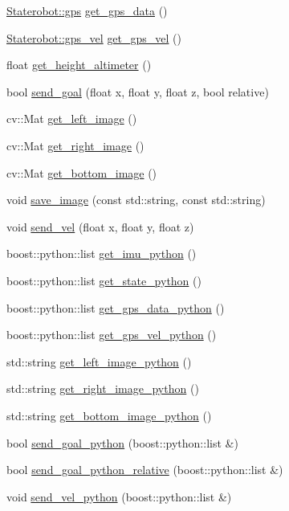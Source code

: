 \begin{DoxyCompactItemize}
\item 
\hyperlink{struct_staterobot_1_1gps}{\-Staterobot\-::gps} \hyperlink{class_staterobot_a3a3ce270f01e5eb9ee6c48a7cf0ae2d4}{get\-\_\-gps\-\_\-data} ()
\item 
\hyperlink{struct_staterobot_1_1gps__vel}{\-Staterobot\-::gps\-\_\-vel} \hyperlink{class_staterobot_ad4c1e88bb08e09049ccaf66d540a2fca}{get\-\_\-gps\-\_\-vel} ()
\item 
float \hyperlink{class_staterobot_a3e92b9d6f17c0812e8ed435602d1f717}{get\-\_\-height\-\_\-altimeter} ()
\item 
bool \hyperlink{class_staterobot_a4f1aff1c608a045faa07fa8b9cff4b65}{send\-\_\-goal} (float x, float y, float z, bool relative)
\item 
cv\-::\-Mat \hyperlink{class_staterobot_a5b0323154aa0a19ed82b02cfe7376974}{get\-\_\-left\-\_\-image} ()
\item 
cv\-::\-Mat \hyperlink{class_staterobot_ab1d8f9bfdbd766b96110c0a65fe08f43}{get\-\_\-right\-\_\-image} ()
\item 
cv\-::\-Mat \hyperlink{class_staterobot_a310b2c9315316f96054357ebb705438f}{get\-\_\-bottom\-\_\-image} ()
\item 
void \hyperlink{class_staterobot_a1da31a1c7a8f39878d2511ca86adeb8f}{save\-\_\-image} (const std\-::string, const std\-::string)
\item 
void \hyperlink{class_staterobot_addfc245d53239eed664812a50a916428}{send\-\_\-vel} (float x, float y, float z)
\item 
boost\-::python\-::list \hyperlink{class_staterobot_a3e6bd1883c62204de398342cf8004351}{get\-\_\-imu\-\_\-python} ()
\item 
boost\-::python\-::list \hyperlink{class_staterobot_a91206b2bef7c39193df2eef7b8bae523}{get\-\_\-state\-\_\-python} ()
\item 
boost\-::python\-::list \hyperlink{class_staterobot_ac2fe6ca526d21c1bcb2e284f000759a4}{get\-\_\-gps\-\_\-data\-\_\-python} ()
\item 
boost\-::python\-::list \hyperlink{class_staterobot_aed3a2e6aa076fe6e38f97eb9ab9ef41a}{get\-\_\-gps\-\_\-vel\-\_\-python} ()
\item 
std\-::string \hyperlink{class_staterobot_ab7e02e341f1f3ccfaaa322a2fc1e2caf}{get\-\_\-left\-\_\-image\-\_\-python} ()
\item 
std\-::string \hyperlink{class_staterobot_ab222942f5fe07919fc4999eb600706d1}{get\-\_\-right\-\_\-image\-\_\-python} ()
\item 
std\-::string \hyperlink{class_staterobot_a36d188439ca66b3e56cff58877297945}{get\-\_\-bottom\-\_\-image\-\_\-python} ()
\item 
bool \hyperlink{class_staterobot_abc938e713a748e1803a304e30145e3d1}{send\-\_\-goal\-\_\-python} (boost\-::python\-::list \&)
\item 
bool \hyperlink{class_staterobot_a5ec7a1fdfa9757ddea8c1587e8324f4a}{send\-\_\-goal\-\_\-python\-\_\-relative} (boost\-::python\-::list \&)
\item 
void \hyperlink{class_staterobot_ae47718241f57b27cf4854730cfb50201}{send\-\_\-vel\-\_\-python} (boost\-::python\-::list \&)
\end{DoxyCompactItemize}
